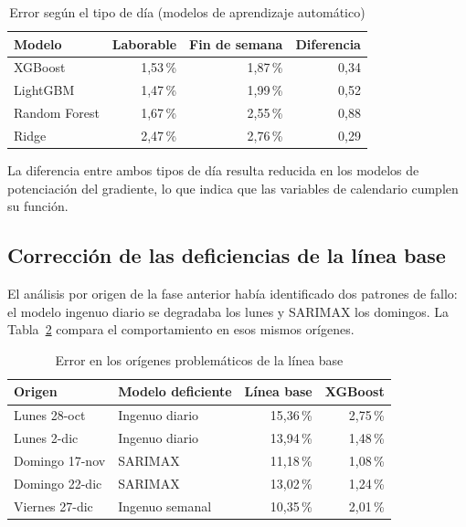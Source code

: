 \begin{table}[H]
\centering
\caption{Error según el tipo de día (modelos de aprendizaje automático)}
\label{tab:tipodia}
\begin{tabular}{|l|r|r|r|}
\hline
\rowcolor{grisclaro}
\textbf{Modelo} & \textbf{Laborable} & \textbf{Fin de semana} & \textbf{Diferencia} \\
\hline
XGBoost       & 1,53\,\% & 1,87\,\% & 0,34 \\
\hline
LightGBM      & 1,47\,\% & 1,99\,\% & 0,52 \\
\hline
Random Forest & 1,67\,\% & 2,55\,\% & 0,88 \\
\hline
Ridge         & 2,47\,\% & 2,76\,\% & 0,29 \\
\hline
\end{tabular}
\end{table}

La diferencia entre ambos tipos de día resulta reducida en los modelos de
potenciación del gradiente, lo que indica que las variables de calendario cumplen
su función.

\subsection*{Corrección de las deficiencias de la línea base}

El análisis por origen de la fase anterior había identificado dos patrones de
fallo: el modelo ingenuo diario se degradaba los lunes y SARIMAX los domingos. La
Tabla~\ref{tab:correccion} compara el comportamiento en esos mismos orígenes.

\begin{table}[H]
\centering
\caption{Error en los orígenes problemáticos de la línea base}
\label{tab:correccion}
\begin{tabular}{|l|l|r|r|}
\hline
\rowcolor{grisclaro}
\textbf{Origen} & \textbf{Modelo deficiente} & \textbf{Línea base} & \textbf{XGBoost} \\
\hline
Lunes 28-oct   & Ingenuo diario  & 15,36\,\% & 2,75\,\% \\
\hline
Lunes 2-dic    & Ingenuo diario  & 13,94\,\% & 1,48\,\% \\
\hline
Domingo 17-nov & SARIMAX         & 11,18\,\% & 1,08\,\% \\
\hline
Domingo 22-dic & SARIMAX         & 13,02\,\% & 1,24\,\% \\
\hline
Viernes 27-dic & Ingenuo semanal & 10,35\,\% & 2,01\,\% \\
\hline
\end{tabular}
\end{table}


